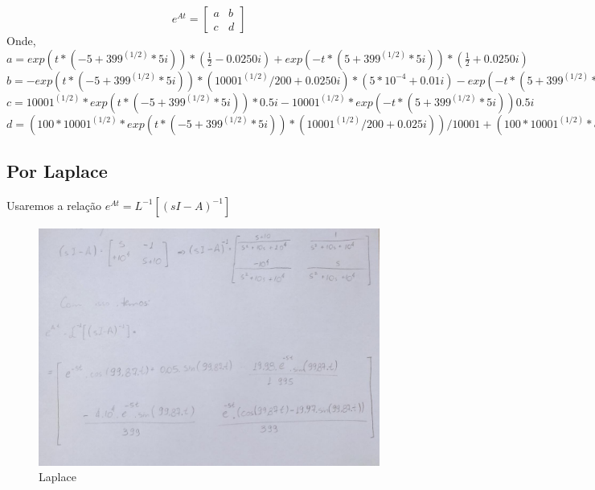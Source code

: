 \documentclass[a4paper, 12pt]{article}
\begin{document}
		\begin{equation}
			e^{At} = \begin{bmatrix}
				a & b\\
				c & d
			\end{bmatrix}
		\end{equation}
		Onde,\\
		
		$a = exp(t*(- 5 + 399^{(1/2)}*5i))*(\frac{1}{2} - 0.0250i)+ exp(-t*(5 + 399^(1/2)*5i))*(\frac{1}{2} + 0.0250i)$\\
		
		$b = - exp(t*(- 5 + 399^(1/2)*5i))*(10001^{(1/2)}/200 + 0.0250i)*(5*10^{-4} + 0.01i) - exp(-t*(5 + 399^{(1/2)}*5i))*(10001^{(1/2)}/200 - 0.0250i)*(5*10^{-4} - 0.01i)$\\
		
		$c = 10001^{(1/2)}*exp(t*(- 5 + 399^{(1/2)}*5i))*0.5i - 10001^{(1/2)}*exp(-t*(5 + 399^(1/2)*5i))0.5i$\\
		
		$d = (100*10001^(1/2)*exp(t*(- 5 + 399^(1/2)*5i))*(10001^(1/2)/200 + 0.025i))/10001 + (100*10001^(1/2)*exp(-t*(5 + 399^(1/2)*5i))*(10001^(1/2)/200 - 0.025i))/10001$\\
		

	\subsection{Por Laplace}
		Usaremos a relação $e^{At} = L^{-1}[(sI-A)^{-1}]$
		\begin{figure}[h]
			\centering
			\includegraphics[scale=0.3]{imagens/a3.jpg}
			\caption{Laplace}
		\end{figure}
		
\end{document}
